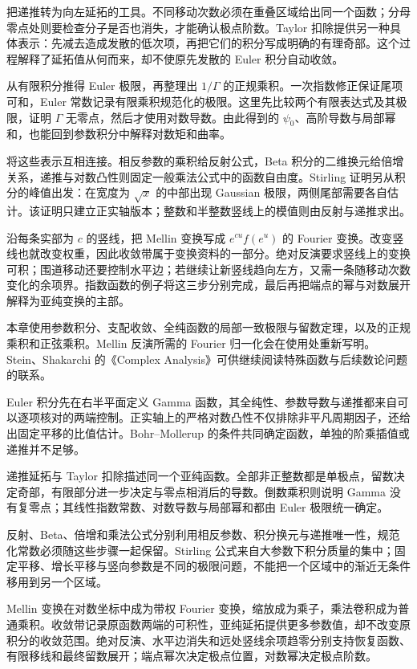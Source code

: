 \ProseParagraphBreak
{}把递推转为向左延拓的工具。不同移动次数必须在重叠区域给出同一个函数；分母零点处则要检查分子是否也消失，才能确认极点阶数。Taylor 扣除提供另一种具体表示：先减去造成发散的低次项，再把它们的积分写成明确的有理奇部。这个过程解释了延拓值从何而来，却不使原先发散的 Euler 积分自动收敛。

\ProseParagraphBreak
{}从有限积分推得 Euler 极限，再整理出 \(1/\Gamma\) 的正规乘积。一次指数修正保证尾项可和，Euler 常数记录有限乘积规范化的极限。这里先比较两个有限表达式及其极限，证明 \(\Gamma\) 无零点，然后才使用对数导数。由此得到的 \(\psi_0\)、高阶导数与局部幂和，也能回到参数积分中解释对数矩和曲率。

\ProseParagraphBreak
{}将这些表示互相连接。相反参数的乘积给反射公式，Beta 积分的二维换元给倍增关系，递推与对数凸性则固定一般乘法公式中的函数自由度。Stirling 证明另从积分的峰值出发：在宽度为 \(\sqrt{x}\) 的中部出现 Gaussian 极限，两侧尾部需要各自估计。该证明只建立正实轴版本；整数和半整数竖线上的模值则由反射与递推求出。

\ProseParagraphBreak
{}沿每条实部为 \(c\) 的竖线，把 Mellin 变换写成 \(e^{cu}f(e^u)\) 的 Fourier 变换。改变竖线也就改变权重，因此收敛带属于变换资料的一部分。绝对反演要求竖线上的变换可积；围道移动还要控制水平边；若继续让新竖线趋向左方，又需一条随移动次数变化的余项界。指数函数的例子将这三步分别完成，最后再把端点的幂与对数展开解释为亚纯变换的主部。

\ProseParagraphBreak
本章使用参数积分、支配收敛、全纯函数的局部一致极限与留数定理，以及的正规乘积和正弦乘积。Mellin 反演所需的 Fourier 归一化会在使用处重新写明。Stein、Shakarchi 的《Complex Analysis》\cite{Stein2003Complex}可供继续阅读特殊函数与后续数论问题的联系。







\begin{chaptersummary}
Euler 积分先在右半平面定义 Gamma 函数，其全纯性、参数导数与递推都来自可以逐项核对的两端控制。正实轴上的严格对数凸性不仅排除非平凡周期因子，还给出固定平移的比值估计。Bohr--Mollerup 的条件共同确定函数，单独的阶乘插值或递推并不足够。

\ProseParagraphBreak
递推延拓与 Taylor 扣除描述同一个亚纯函数。全部非正整数都是单极点，留数决定奇部，有限部分进一步决定与零点相消后的导数。倒数乘积则说明 Gamma 没有复零点；其线性指数常数、对数导数与局部幂和都由 Euler 极限统一确定。

\ProseParagraphBreak
反射、Beta、倍增和乘法公式分别利用相反参数、积分换元与递推唯一性，规范化常数必须随这些步骤一起保留。Stirling 公式来自大参数下积分质量的集中；固定平移、增长平移与竖向参数是不同的极限问题，不能把一个区域中的渐近无条件移用到另一个区域。

\ProseParagraphBreak
Mellin 变换在对数坐标中成为带权 Fourier 变换，缩放成为乘子，乘法卷积成为普通乘积。收敛带记录原函数两端的可积性，亚纯延拓提供更多参数值，却不改变原积分的收敛范围。绝对反演、水平边消失和远处竖线余项趋零分别支持恢复函数、有限移线和最终留数展开；端点幂次决定极点位置，对数幂决定极点阶数。
\end{chaptersummary}

